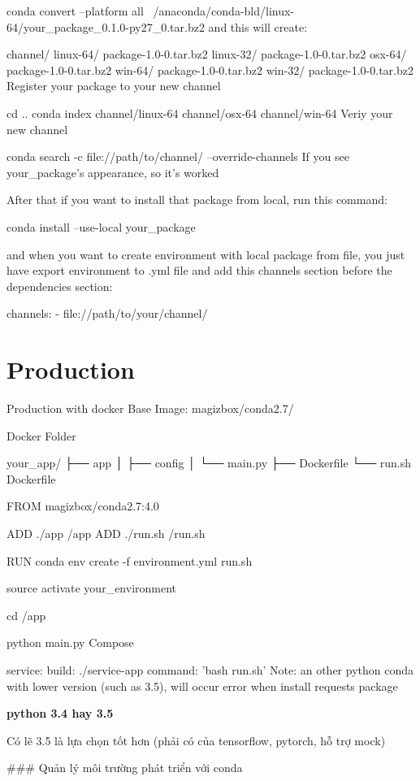 conda convert --platform all ~/anaconda/conda-bld/linux-64/your_package_0.1.0-py27_0.tar.bz2
and this will create:

channel/
linux-64/
   package-1.0-0.tar.bz2
linux-32/
   package-1.0-0.tar.bz2
osx-64/
   package-1.0-0.tar.bz2
win-64/
   package-1.0-0.tar.bz2
win-32/
   package-1.0-0.tar.bz2
Register your package to your new channel

cd ..
conda index channel/linux-64 channel/osx-64 channel/win-64
Veriy your new channel

conda search -c file://path/to/channel/ --override-channels
If you see your_package's appearance, so it's worked

After that if you want to install that package from local, run this command:


conda install --use-local your_package

and when you want to create environment with local package from file, you just have export environment to .yml file and add this channels section before the dependencies section:


channels:
- file://path/to/your/channel/

\section{Production}

Production with docker
Base Image: magizbox/conda2.7/

Docker Folder

your_app/
├── app
│   ├── config
│   └── main.py
├── Dockerfile
└── run.sh
Dockerfile

FROM magizbox/conda2.7:4.0

ADD ./app /app
ADD ./run.sh /run.sh

RUN conda env create -f environment.yml
run.sh

source activate your_environment

cd /app

python main.py
Compose

 service:
  build: ./service-app
  command: 'bash run.sh'
Note: an other python conda with lower version (such as 3.5), will occur error when install requests package

\noindent \textbf{python 3.4 hay 3.5}

Có lẽ 3.5 là lựa chọn tốt hơn (phải có của tensorflow, pytorch, hỗ trợ mock)

### Quản lý môi trường phát triển với conda

